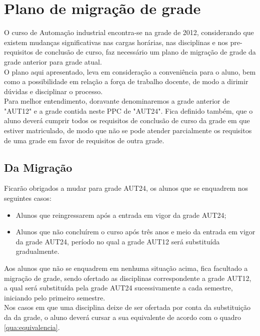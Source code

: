 \chapter{Plano de migração de grade}

O curso de Automação industrial encontra-se na grade de 2012, considerando que existem mudanças significativas nas cargas horárias, nas disciplinas e nos pre-requisitos de conclusão de curso, faz necessário um plano de migração de grade da grade anterior para grade atual.\\

O plano aqui apresentado, leva em consideração a conveniência para o aluno, bem como a possibilidade em relação a força de trabalho docente, de modo a dirimir dúvidas e disciplinar o processo.\\

Para melhor entendimento, doravante denominaremos a grade anterior de "AUT12" e a grade contida neste PPC de "AUT24". Fica definido também, que o aluno deverá cumprir todos os requisitos de conclusão de curso da grade em que estiver matriculado, de modo que não se pode atender parcialmente os requisitos de uma grade em favor de requisitos de outra grade.\\

\section{Da Migração}

Ficarão obrigados a mudar para grade AUT24, os alunos que se enquadrem nos seguintes casos:

\begin{itemize}
\item Alunos que reingressarem após a entrada em vigor da grade AUT24;
\item Alunos que não concluírem o curso após três anos e meio da entrada em vigor da grade AUT24, período no qual a grade AUT12 será substituída gradualmente.
\end{itemize}

Aos alunos que não se enquadrem em nenhuma situação acima, fica facultado a migração de grade, sendo ofertado as disciplinas correspondente a grade AUT12, a qual será substituída pela grade AUT24 sucessivamente a cada semestre, iniciando pelo primeiro semestre.\\

Nos casos em que uma disciplina deixe de ser ofertada por conta da substituição da da grade, o aluno deverá cursar a sua equivalente de acordo com o quadro  \ref{qua:equivalencia}.\\

